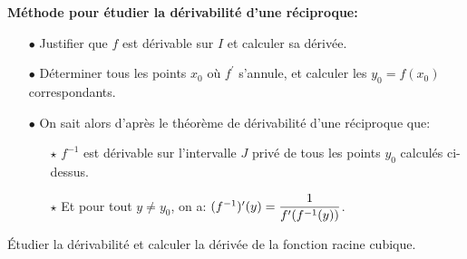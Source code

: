 \documentclass[a4paper, 11pt]{article}
\begin{document}
{\textbf{M\'ethode pour \'etudier la d\'erivabilit\'e d'une r\'eciproque:}
\begin{itemize}
	\item[$\bullet$]  Justifier que $f$ est d\'erivable sur $I$ et calculer sa d\'eriv\'ee.
	\item[$\bullet$] D\'eterminer tous les points $x_0$ o\`u $f^{\prime}$ s'annule, et calculer les $y_0=f(x_0)$ correspondants.
	\item[$\bullet$] On sait alors d'apr\`{e}s le th\'eor\`{e}me de d\'erivabilit\'e d'une r\'eciproque que:
		\begin{itemize}
			\item[$\star$] $f^{-1}$ est d\'erivable sur l'intervalle $J$ priv\'e de tous les points $y_0$ calcul\'es ci-dessus.
			\item[$\star$] Et pour tout $y\not= y_0$, on a: $(f^{-1})^{\prime}(y)=\displaystyle\frac{1}{f^{\prime}(f^{-1}(y))}$.
		\end{itemize}
\end{itemize}

\setlength\fboxrule{0.5pt}

%

{\footnotesize
	\begin{exercice}
		\'Etudier la d\'erivabilit\'e et calculer la d\'eriv\'ee de la fonction racine cubique.
	\end{exercice}}


}
\end{document}

